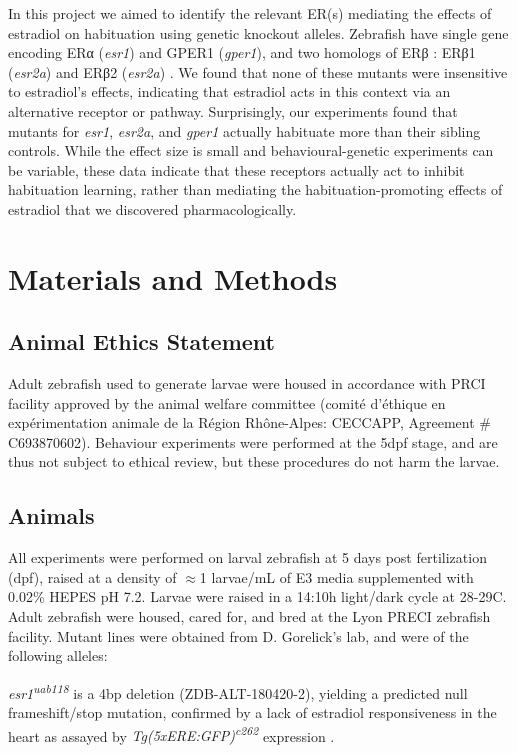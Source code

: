 \documentclass[9pt,lineno]{RandlettLab_elife}
\begin{document}
In this project we aimed to identify the relevant ER(s) mediating the effects of estradiol on habituation using genetic knockout alleles.
Zebrafish have single gene encoding ERα (\emph{esr1}) and GPER1 (\emph{gper1}), and two homologs of ERβ : ERβ1 (\emph{esr2a}) and ERβ2 (\emph{esr2a})  \citep{Romano2017-ep, Menuet2002-fo}.  
We found that none of these mutants were insensitive to estradiol's effects, indicating that estradiol acts in this context via an alternative receptor or pathway. 
Surprisingly, our experiments found that mutants for \emph{esr1}, \emph{esr2a}, and \emph{gper1} actually habituate more than their sibling controls. 
While the effect size is small and behavioural-genetic experiments can be variable, these data indicate that these receptors actually act to inhibit habituation learning, rather than mediating the habituation-promoting effects of estradiol that we discovered pharmacologically. 

\section{Materials and Methods}

\subsection{Animal Ethics Statement}

Adult zebrafish used to generate larvae were housed in accordance with PRCI facility approved by the animal welfare committee (comité d’éthique en expérimentation animale de la Région Rhône-Alpes: CECCAPP, Agreement \# C693870602). 
Behaviour experiments were performed at the 5dpf stage, and are thus not subject to ethical review, but these procedures do not harm the larvae. 

\subsection{Animals}

All experiments were performed on larval zebrafish at 5 days post fertilization (dpf), raised at a density of $\approx$1 larvae/mL of E3 media supplemented with 0.02\% HEPES pH 7.2. 
Larvae were raised in a 14:10h light/dark cycle at 28-29\degree{}C. 
Adult zebrafish were housed, cared for, and bred at the Lyon PRECI zebrafish facility. 
Mutant lines were obtained from D. Gorelick's lab, and were of the following alleles: 

\emph{esr1\textsuperscript{uab118}} is a 4bp deletion (ZDB-ALT-180420-2), yielding a predicted null frameshift/stop mutation, confirmed by a lack of estradiol responsiveness in the heart as assayed by \emph{Tg(5xERE:GFP)\textsuperscript{c262}} expression \citep{Romano2017-ep}. 
\end{document}
